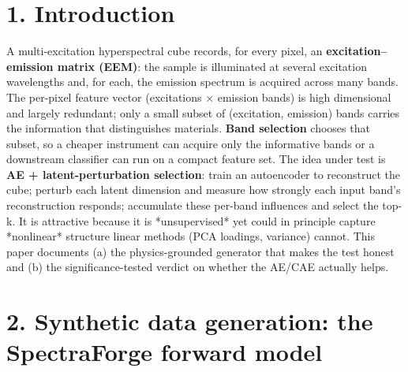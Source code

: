 \documentclass[11pt]{article}
\begin{document}
\section*{1. Introduction}
A multi-excitation hyperspectral cube records, for every pixel, an \textbf{excitation–emission matrix (EEM)}:
the sample is illuminated at several excitation wavelengths and, for each, the emission spectrum is
acquired across many bands. The per-pixel feature vector (excitations × emission bands) is high
dimensional and largely redundant; only a small subset of (excitation, emission) bands carries the
information that distinguishes materials. \textbf{Band selection} chooses that subset, so a cheaper instrument
can acquire only the informative bands or a downstream classifier can run on a compact feature set.
The idea under test is \textbf{AE + latent-perturbation selection}: train an autoencoder to reconstruct the
cube; perturb each latent dimension and measure how strongly each input band's reconstruction responds;
accumulate these per-band influences and select the top-k. It is attractive because it is *unsupervised*
yet could in principle capture *nonlinear* structure linear methods (PCA loadings, variance) cannot.
This paper documents (a) the physics-grounded generator that makes the test honest and (b) the
significance-tested verdict on whether the AE/CAE actually helps.
\section*{2. Synthetic data generation: the SpectraForge forward model}
\end{document}
